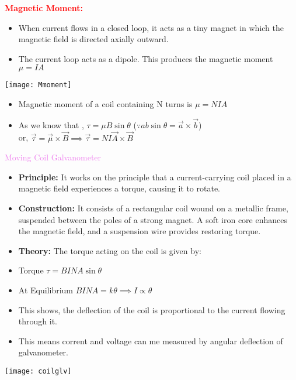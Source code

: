 \documentclass{beamer}
\begin{document}
\begin{frame}
\textcolor{red}{\textbf{Magnetic Moment:}} \\
\begin{minipage}{0.7\textwidth}
\begin{itemize}
\item When current flows in a closed loop, it acts as a tiny
magnet in which the magnetic field is directed axially
outward.
\item The current loop acts as a dipole. This produces the magnetic
moment $\mu=IA$
\end{itemize}
\end{minipage}%
\begin{minipage}{0.3\textwidth}
    \texttt{[image: Mmoment]} %
\end{minipage}
\begin{itemize}
\item Magnetic moment of a coil containing
N turns is  $\mu=NIA$
\item As we know that , $\tau=\mu B \sin\theta $ ($\because ab\sin\theta=\vec{a}\times \vec{b}$)\\
or, $\vec{\tau}=\vec{\mu}\times\vec{B}\implies \vec{\tau}=NI\vec{A}\times\vec{B}$
\end{itemize}
\textcolor{violet}{Moving Coil Galvanometer}\\
\begin{itemize}
\item \textbf{Principle:} It works on the principle that a current-carrying coil placed in a magnetic field experiences a torque, causing it to rotate.

\item \textbf{Construction:} It consists of a rectangular coil wound on a metallic frame, suspended between the poles of a strong magnet. A soft iron core enhances the magnetic field, and a suspension wire provides restoring torque.

\item \textbf{Theory:} The torque acting on the coil is given by:
\end{itemize}

\end{frame}

\begin{minipage}{0.7\textwidth}
\begin{itemize}
\item Torque $\tau=BINA\sin\theta$
\item At Equilibrium $BINA=k\theta \implies I\propto \theta$
\item This shows, the deflection of the coil is proportional to the current flowing through it.
\item This means corrent and voltage can me measured by angular deflection of galvanometer.
\end{itemize}

\end{minipage}%
\begin{minipage}{0.3\textwidth}
    \texttt{[image: coilglv]} %
\end{minipage}
\end{document}
